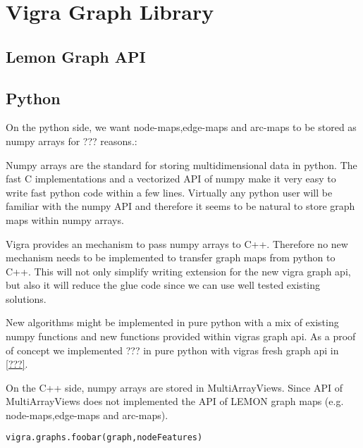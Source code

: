 \chapter{Vigra Graph Library} \label{ch:vigra_graph_lib}





\section{Lemon Graph API}








\section{Python}

On the python side, we want node-maps,edge-maps and arc-maps to be stored 
as numpy arrays for ??? reasons.:
\begin{compactitem}
    \item Numpy arrays are the standard for storing multidimensional data in python.
    The fast C implementations and a vectorized API of numpy make it very easy to write 
    fast python code within a few lines.
    Virtually any python user will be familiar with the numpy API and therefore it 
    seems to be natural to store graph maps within numpy arrays.
    \item Vigra provides an mechanism to pass numpy arrays to C++.
    Therefore no new mechanism needs to be implemented to transfer graph
    maps from python to C++.
    This will not only simplify writing extension for the new vigra graph api,
    but also it will reduce the glue code since we can use well tested existing
    solutions.
    \item New algorithms might be implemented in pure python with a mix of
    existing numpy functions and new functions provided within vigras graph api.
    As a proof of concept we implemented ??? in pure python with vigras
    fresh graph api in \cref{???}.
\end{compactitem}

On the C++ side, numpy arrays are stored in MultiArrayViews.
Since API of MultiArrayViews \cite{software_vigra_multiarray_api} does
not implemented the API  of LEMON graph maps (e.g. node-maps,edge-maps and arc-maps).
 

\begin{lstlisting}[language=python]
vigra.graphs.foobar(graph,nodeFeatures)
\end{lstlisting}

